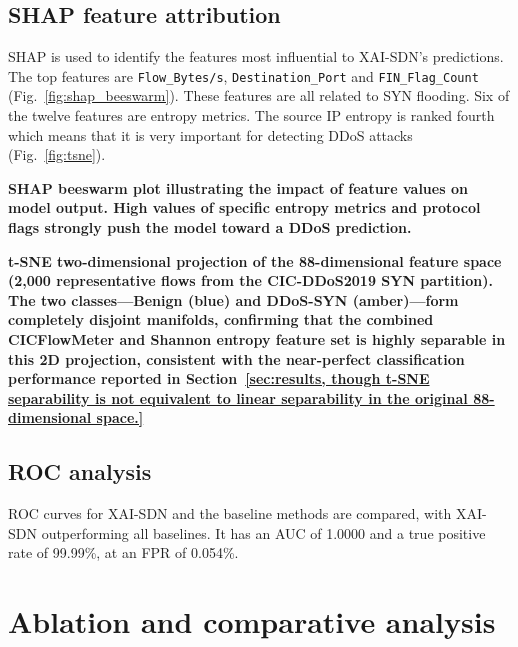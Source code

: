 \documentclass{ieeeaccess}
\begin{document}
\subsection{SHAP feature attribution}
SHAP is used to identify the features most influential to XAI-SDN's predictions. The top features are \texttt{Flow\_Bytes/s}, \texttt{Destination\_Port} and \texttt{FIN\_Flag\_Count} (Fig.~\ref{fig:shap_beeswarm}). These features are all related to SYN flooding. Six of the twelve features are entropy metrics. The source IP entropy is ranked fourth which means that it is very important for detecting DDoS attacks (Fig.~\ref{fig:tsne}).

{ \textbf{SHAP beeswarm plot illustrating the impact of feature values on model output. High values of specific entropy metrics and protocol flags strongly push the model toward a DDoS prediction.}\label{fig:shap_beeswarm}}

{ \textbf{t-SNE two-dimensional projection of the 88-dimensional feature space (2,000 representative flows from the CIC-DDoS2019 SYN partition). The two classes---Benign (blue) and DDoS-SYN (amber)---form completely disjoint manifolds, confirming that the combined CICFlowMeter and Shannon entropy feature set is highly separable in this 2D projection, consistent with the near-perfect classification performance reported in Section~\ref{sec:results, though t-SNE separability is not equivalent to linear separability in the original 88-dimensional space.}}\label{fig:tsne}}

\subsection{ROC analysis}
ROC curves for XAI-SDN and the baseline methods are compared, with XAI-SDN outperforming all baselines. It has an AUC of 1.0000 and a true positive rate of 99.99\%, at an FPR of 0.054\%.

\section{Ablation and comparative analysis}
\label{sec:comparative}
\end{document}

